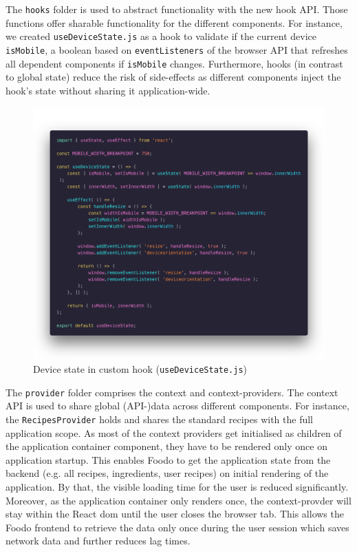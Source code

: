 The \texttt{hooks} folder is used to abstract functionality with the new hook API. Those functions offer sharable functionality for the different components. For instance, we created \texttt{useDeviceState.js} as a hook to validate if the current device \texttt{isMobile}, a boolean based on \texttt{eventListeners} of the browser API that refreshes all dependent components if \texttt{isMobile} changes. Furthermore, hooks (in contrast to global state) reduce the risk of side-effects as different components inject the hook's state without sharing it application-wide. 

\begin{figure}[!ht]
	\captionsetup{justification=centering}
	\centering
	\includegraphics[scale=0.28]{Ressourcen/img/code/hook.png}
	\vspace{-4em}
	\caption{Device state in custom hook (\texttt{useDeviceState.js})}
	\label{fig:button}
\end{figure}

The \texttt{provider} folder comprises the context and context-providers. The context API is used to share global (API-)data across different components. For instance, the \texttt{RecipesProvider} holds and shares the standard recipes with the full application scope. As most of the context providers get initialised as children of the application container component, they have to be rendered only once on application startup. This enables Foodo to get the application state from the backend (e.g. all recipes, ingredients, user recipes) on initial rendering of the application. By that, the visible loading time for the user is reduced significantly. Moreover, as the application container only renders once, the context-provder will stay within the React \gls{dom} until the user closes the browser tab. This allows the Foodo frontend to retrieve the data only once during the user session which saves network data and further reduces lag times.

